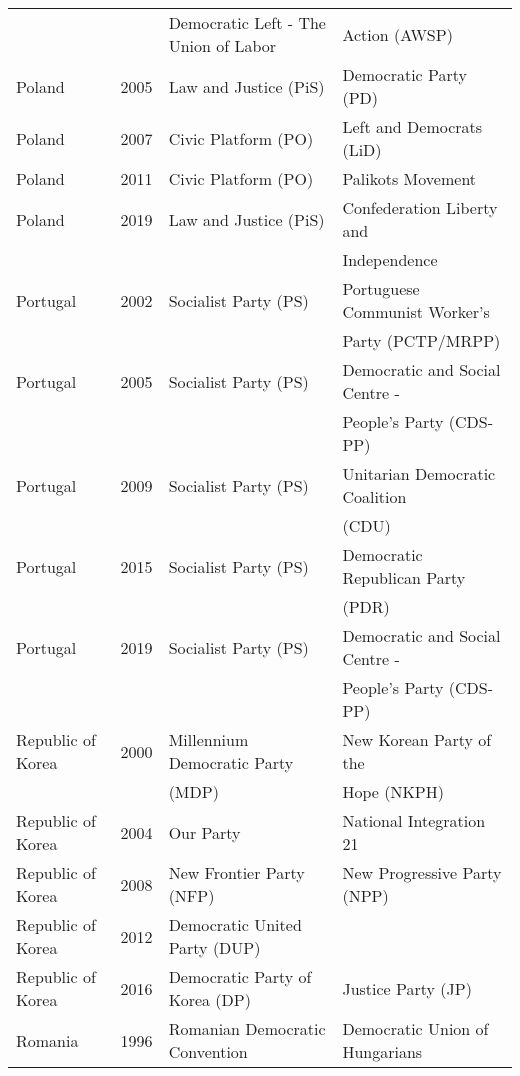 {\begin{longtable}{|l|c|l|l|}
    &  &   Democratic   Left - The Union of  Labor &     Action (AWSP)  \\ 
  Poland & 2005 &   Law and Justice (PiS) &   Democratic Party (PD) \\ 
  Poland & 2007 &   Civic Platform (PO) &   Left and Democrats (LiD)  \\ 
  Poland & 2011 &   Civic Platform (PO) &   Palikots Movement \\ 
   Poland & 2019 &   Law and Justice (PiS) &   Confederation Liberty and  \\ 
               &      &         &     Independence  \\ 
   Portugal & 2002 &   Socialist Party (PS) &   Portuguese Communist Worker's \\ 
               &      &         &    Party (PCTP/MRPP)  \\ 
   Portugal & 2005 &   Socialist Party (PS) &   Democratic and Social Centre -  \\ 
               &      &         & People's Party (CDS-PP)    \\ 
  Portugal & 2009 &   Socialist Party (PS) &   Unitarian Democratic Coalition  \\ 
               &      &         &    (CDU)   \\ 
  Portugal & 2015 &   Socialist Party (PS) &   Democratic Republican Party  \\ 
               &      &         &   (PDR)  \\ 
   Portugal & 2019 &   Socialist Party (PS) &   Democratic and Social Centre - \\ 
               &      &         &   People's Party (CDS-PP)   \\ 
   Republic of Korea & 2000 &   Millennium Democratic Party  &   New Korean Party of the \\ 
               &      &      (MDP)   &   Hope (NKPH)   \\ 
   Republic of Korea & 2004 &   Our Party &   National Integration 21 \\ 
   Republic of Korea & 2008 &   New Frontier Party (NFP)   &   New Progressive Party (NPP) \\ 
   Republic of Korea & 2012 &   Democratic United Party (DUP) &  \\ 
   Republic of Korea & 2016 &   Democratic Party of Korea (DP) &   Justice Party (JP) \\ 
   Romania & 1996 &   Romanian Democratic Convention  &   Democratic Union of Hungarians  \\ 

\end{longtable}}
